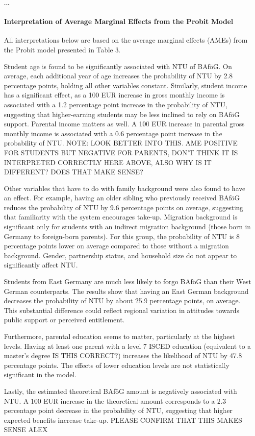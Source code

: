 ...

\paragraph{Interpretation of Average Marginal Effects from the Probit Model}


All interpretations below are based on the average marginal effects (AMEs) from the Probit model presented in Table 3.

Student age is found to be significantly associated with NTU of BAföG. On average, each additional year of age increases the probability of NTU by 2.8 percentage points, holding all other variables constant. Similarly, student income has a significant effect, as a 100 EUR increase in gross monthly income is associated with a 1.2 percentage point increase in the probability of NTU, suggesting that higher-earning students may be less inclined to rely on BAföG support. Parental income matters as well. A 100 EUR increase in parental gross monthly income is associated with a 0.6 percentage point increase in the probability of NTU. NOTE: LOOK BETTER INTO THIS. AME POSITIVE FOR STUDENTS BUT NEGATIVE FOR PARENTS, DON’T THINK IT IS INTERPRETED CORRECTLY HERE ABOVE, ALSO WHY IS IT DIFFERENT? DOES THAT MAKE SENSE?

Other variables that have to do with family background were also found to have an effect. For example, having an older sibling who previously received BAföG reduces the probability of NTU by 9.6 percentage points on average, suggesting that familiarity with the system encourages take-up. Migration background is significant only for students with an indirect migration background (those born in Germany to foreign-born parents). For this group, the probability of NTU is 8 percentage points lower on average compared to those without a migration background.  Gender, partnership status, and household size do not appear to significantly affect NTU.

Students from East Germany are much less likely to forgo BAföG than their West German counterparts. The results show that having an East German background decreases the probability of NTU by about 25.9 percentage points, on average. This substantial difference could reflect regional variation in attitudes towards public support or perceived entitlement.

Furthermore, parental education seems to matter, particularly at the highest levels. Having at least one parent with a level 7 ISCED education (equivalent to a master’s degree IS THIS CORRECT?) increases the likelihood of NTU by 47.8 percentage points. The effects of lower education levels are not statistically significant in the model.

Lastly, the estimated theoretical BAföG amount is negatively associated with NTU. A 100 EUR increase in the theoretical amount corresponds to a 2.3 percentage point decrease in the probability of NTU, suggesting that higher expected benefits increase take-up. PLEASE CONFIRM THAT THIS MAKES SENSE ALEX








